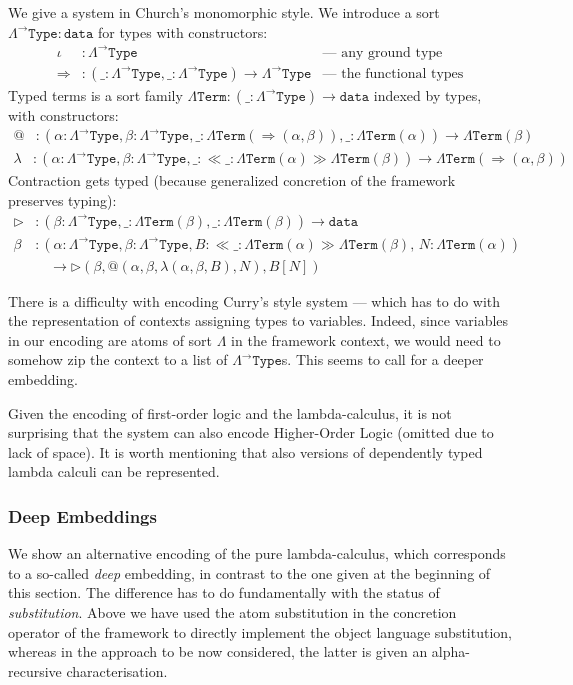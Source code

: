\documentclass[11pt,a4paper]{amsart}
\newcounter{s}
\newcommand{\absort}[2]{\ensuremath{\ll\!\!#1\!\!\gg #2}}
\newcommand{\dta}{\texttt{data}}
\newcommand{\LATy}{\ensuremath{\Lambda^{\rightarrow}\texttt{Type}}}
\newcommand{\LTrm}{\ensuremath{\Lambda\texttt{Term}}}
\begin{document}
We give a system in Church's monomorphic style. We introduce a sort $\LATy : \dta$ for types with constructors:
\begin{align*}
\iota &: \LATy &  \text{— any ground type}\\
\Rightarrow &: (\_ : \LATy,\_ : \LATy) \rightarrow \LATy & \text{— the functional types}
\end{align*}
%
Typed terms is a sort family $\LTrm : (\_ : \LATy) \rightarrow \dta$ indexed by types, with
constructors:
%
\begin{align*}
@ &: (\alpha : \LATy, \beta : \LATy, \_ : \LTrm(\Rightarrow(\alpha, \beta)),\_ : \LTrm(\alpha)) \rightarrow \LTrm(\beta)
\end{align*}
\begin{align*}
\lambda &: (\alpha:\LATy, \beta:\LATy,\_:\absort{\_{:}\LTrm(\alpha)}{\LTrm(\beta)}) \rightarrow \LTrm(\Rightarrow(\alpha, \beta))
\end{align*}
%
Contraction gets typed (because generalized concretion of the framework preserves typing):
%
\begin{align*}
\triangleright &: (\beta : \LATy, \_ : \LTrm(\beta), \_ : \LTrm(\beta)) \rightarrow \dta\\
\beta &: (\alpha : \LATy, \beta : \LATy, B : \absort{\_{:} \LTrm(\alpha)}{\LTrm(\beta)},\, N : \LTrm(\alpha)) \\
    & \quad \rightarrow \triangleright(\beta,@(\alpha,\beta,\lambda(\alpha,\beta,B),N), B[N])
\end{align*}

There is a difficulty with encoding Curry’s style system --- which has to do with the representation of contexts assigning types to variables. Indeed, since variables in our encoding are atoms of sort $\Lambda$ in the framework context, we would need to somehow zip the context to a list of $\LATy$s. This seems to call for a deeper embedding.%


Given the encoding of first-order logic and the lambda-calculus, it is not surprising that the system can also encode Higher-Order Logic (omitted due to lack of space). It is worth mentioning that also versions of dependently typed lambda calculi can be represented.

\subsubsection*{Deep Embeddings}
\label{sec:deep-embeddings}
We show an alternative encoding of the pure lambda-calculus, which corresponds to a so-called \emph{deep} embedding, in contrast to the one given at the beginning of this section. The difference has to do fundamentally with the status of \emph{substitution}. Above we have used the atom substitution in the concretion operator of the framework to directly implement the object language substitution, whereas in the approach to be now considered, the latter is given an alpha-recursive characterisation.
\end{document}
